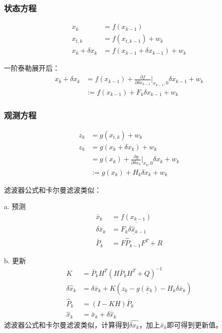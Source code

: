 \subsubsection*{状态方程}
\begin{equation}
	\begin{split}
		x_{k} &= f(x_{k-1}) \\
		x_{t,k} &= f(x_{t,{k-1}}) + w_k \\
		x_k+\delta{x_k} &= f(x_{k-1}+\delta{x_{k-1}})+w_k
	\end{split}
\end{equation}
\par 一阶泰勒展开后：
\begin{equation}
	\begin{split}
		x_k+\delta{x_k} &= f(x_{k-1})+\frac{\partial f}{\partial\delta{x_{k-1}}}\bigg|_{x_{k-1},0} \delta{x_{k-1}} + w_k \\
		&:= f(x_{k-1})+F_k \delta{x_{k-1}} + w_k
	\end{split}
\end{equation}
\subsubsection*{观测方程}
\begin{equation}
	\begin{split}
		z_k &= g(x_{t,k}) + w_k \\
		z_k &= g(x_k+\delta{x_k})+w_k \\
		&= g(x_k)+\frac{\partial g}{\partial\delta{x_k}}\bigg|_{x_k,0} \delta{x_k} + w_k \\
		&:= g(x_k)+H_k \delta{x_k} + w_k
	\end{split}
\end{equation}
\par 滤波器公式和卡尔曼滤波类似：
\par a. 预测
\begin{equation}
	\begin{split}
		\bar{x}_k &= \underline{ f(\hat{x}_{k-1}) } \\
		\delta\bar{x}_k &= \underline{ F_k \delta\hat{x}_{k-1} } \\
		\bar{P}_k&=F\hat{P}_{k-1}F^T+R
	\end{split}
\end{equation}
\par b. 更新
\begin{equation}
	\begin{split}
		K&=\bar{P}_k H^T(H \bar{P}_k H^T + Q)^{-1} \\
		\delta\hat{x}_k&=\delta\bar{x}_k+K(z_k - \underline{g(\bar{x}_k)} - H_k\delta\bar{x}_k) \\
		\hat{P}_k&=(I-K H)\bar{P}_k \\
		\hat{x}_k &= \bar{x}_k + \delta\hat{x}_k
	\end{split}
\end{equation}
滤波器公式和卡尔曼滤波类似，计算得到$\hat{\delta{x_k}}$，加上$\bar{x}_k$即可得到更新值。



